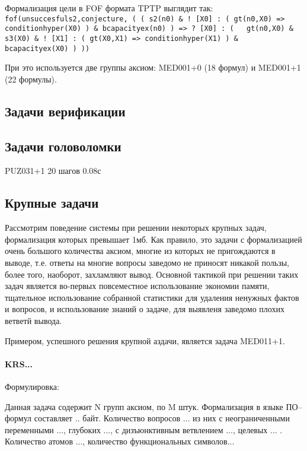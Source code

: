 Формализация цели в FOF формата TPTP выглядит так:
\texttt{fof(unsuccesfuls2,conjecture,
    ( ( s2(n0)
      \& ! [X0] :
          ( gt(n0,X0)
         => conditionhyper(X0) )
      \& bcapacityex(n0) )
   => ? [X0] :
        ( ~ gt(n0,X0)
        \& s3(X0)
        \& ! [X1] :
            ( gt(X0,X1)
           => conditionhyper(X1) )
        \& bcapacityex(X0) ) ))}

При это используется две группы аксиом: MED001+0 (18 формул) и MED001+1 (22 формулы).



\subsection{Задачи верификации}


\subsection{Задачи головоломки}
PUZ031+1
20 шагов
0.08с


\subsection{Крупные задачи}
Рассмотрим поведение системы при решении некоторых крупных задач, формализация которых превышает 1мб. Как правило, это задачи с формализацией очень большого количества аксиом, многие из которых не пригождаются в выводе, т.е. ответы на многие вопросы заведомо не приносят никакой пользы, более того, наоборот, захламляют вывод. Основной тактикой при решении таких задач является во-первых повсеместное использование экономии памяти, тщательное использование собранной статистики для удаления ненужных фактов и вопросов, и использование знаний о задаче, для выявленя заведомо плохих ветветй вывода.

Примером, успешного решения крупной аздачи, является задача MED011+1.

\paragraph{KRS...}
Формулировка:

Данная задача содержит N групп аксиом, по M штук. Формализация в языке ПО--формул составляет .. байт. Количество вопросов ... из них с неограниченными переменными ..., глубоких ..., с дизъюнктивным ветвлением ..., целевых ... . Количество атомов ..., количество функциональных символов... 


